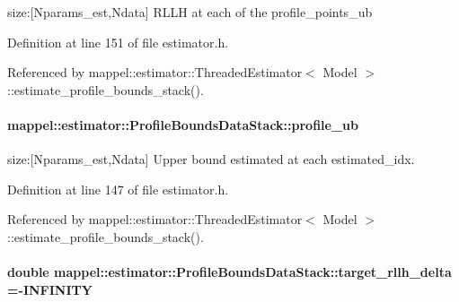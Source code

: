 size\+:\mbox{[}Nparams\+\_\+est,Ndata\mbox{]} R\+L\+LH at each of the profile\+\_\+points\+\_\+ub 



Definition at line 151 of file estimator.\+h.



Referenced by mappel\+::estimator\+::\+Threaded\+Estimator$<$ Model $>$\+::estimate\+\_\+profile\+\_\+bounds\+\_\+stack().

\paragraph[{\texorpdfstring{profile\+\_\+ub}{profile_ub}}]{ mappel\+::estimator\+::\+Profile\+Bounds\+Data\+Stack\+::profile\+\_\+ub}\hypertarget{structmappel_1_1estimator_1_1ProfileBoundsDataStack_ae9c006b881ba89bd13bb2a5368819dbe}{}\label{structmappel_1_1estimator_1_1ProfileBoundsDataStack_ae9c006b881ba89bd13bb2a5368819dbe}


size\+:\mbox{[}Nparams\+\_\+est,Ndata\mbox{]} Upper bound estimated at each estimated\+\_\+idx. 



Definition at line 147 of file estimator.\+h.



Referenced by mappel\+::estimator\+::\+Threaded\+Estimator$<$ Model $>$\+::estimate\+\_\+profile\+\_\+bounds\+\_\+stack().

\paragraph[{\texorpdfstring{target\+\_\+rllh\+\_\+delta}{target_rllh_delta}}]{\setlength{\rightskip}{0pt plus 5cm}double mappel\+::estimator\+::\+Profile\+Bounds\+Data\+Stack\+::target\+\_\+rllh\+\_\+delta =-\/I\+N\+F\+I\+N\+I\+TY}\hypertarget{structmappel_1_1estimator_1_1ProfileBoundsDataStack_a05d506b252e3e6ddc1a5036b60e8e854}{}\label{structmappel_1_1estimator_1_1ProfileBoundsDataStack_a05d506b252e3e6ddc1a5036b60e8e854}


